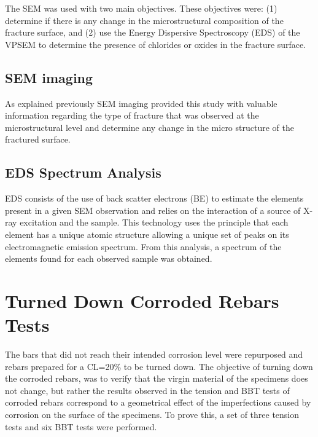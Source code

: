 The SEM was used with two main objectives. These objectives were: (1) determine if there is any change in the microstructural composition of the fracture surface, and (2) use the Energy Dispersive Spectroscopy (EDS) of the VPSEM to determine the presence of chlorides or oxides in the fracture surface. 

\subsection{SEM imaging}
As explained previously SEM imaging provided this study with valuable information regarding the type of fracture that was observed at the microstructural level and determine any change in the micro structure of the fractured surface.

\subsection{EDS Spectrum Analysis}

EDS consists of the use of back scatter electrons (BE) to estimate the elements present in a given SEM observation and relies on the interaction of a source of X-ray excitation and the sample. This technology uses the principle that each element has a unique atomic structure allowing a unique set of peaks on its electromagnetic emission spectrum. From this analysis, a spectrum of the elements found for each observed sample was obtained.

\section{Turned Down Corroded Rebars Tests}

The bars that did not reach their intended corrosion level were repurposed and rebars prepared for a CL=20\% to be turned down. The objective of turning down the corroded rebars, was to verify that the virgin material of the specimens does not change, but rather the results observed in the tension and BBT tests of corroded rebars correspond to a geometrical effect of the imperfections caused by corrosion on the surface of the specimens. To prove this, a set of three tension tests and six BBT tests were performed.

